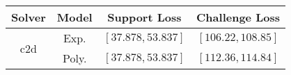 \begin{tabular}{cc|c|c} 
\hline 
 Solver & Model & Support Loss  & Challenge Loss \tabularnewline\hline 
\hline 
\multirow{2}{*}{c2d} & Exp. & $\mathbf{\left[37.878,53.837\right]}$ & $\mathbf{\left[106.22,108.85\right]}$ \tabularnewline 
 & Poly. & $\left[37.878,53.837\right]$ & $\left[112.36,114.84\right]$ \tabularnewline 
\hline 
\end{tabular} 

